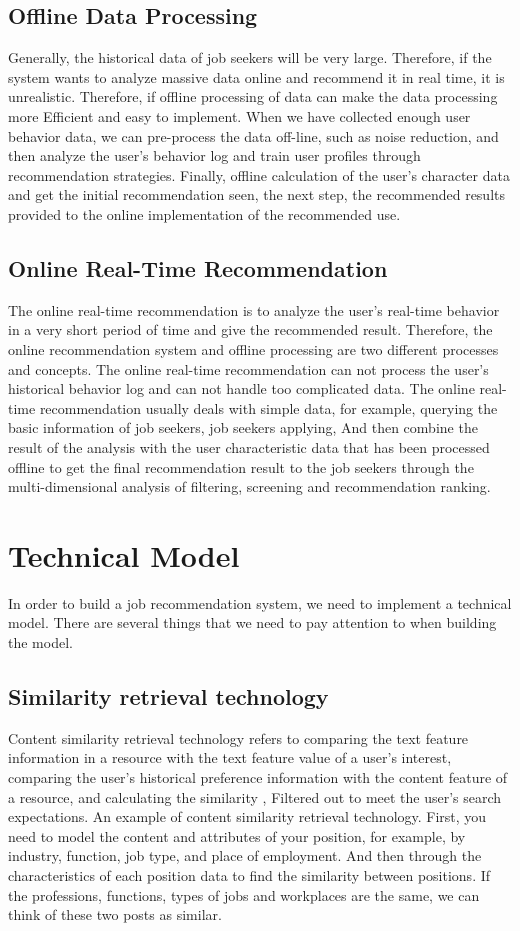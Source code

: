 \documentclass[sigconf]{acmart}
\begin{document}
\subsection{Offline Data Processing}
Generally, the historical data of job seekers will be very large. Therefore, if the system wants to analyze massive data online and recommend it in real time, it is unrealistic. Therefore, if offline processing of data can make the data processing more Efficient and easy to implement. When we have collected enough user behavior data, we can pre-process the data off-line, such as noise reduction, and then analyze the user's behavior log and train user profiles through recommendation strategies. Finally, offline calculation of the user's character data and get the initial recommendation seen, the next step, the recommended results provided to the online implementation of the recommended use.

\subsection{Online Real-Time Recommendation}
The online real-time recommendation is to analyze the user's real-time behavior in a very short period of time and give the recommended result. Therefore, the online recommendation system and offline processing are two different processes and concepts. The online real-time recommendation can not process the user's historical behavior log and can not handle too complicated data. The online real-time recommendation usually deals with simple data, for example, querying the basic information of job seekers, job seekers applying, And then combine the result of the analysis with the user characteristic data that has been processed offline to get the final recommendation result to the job seekers through the multi-dimensional analysis of filtering, screening and recommendation ranking.


\section{Technical Model}
In order to build a job recommendation system, we need to implement a technical model. There are several things that we need to pay attention to when building the model.

\subsection{Similarity retrieval technology}
Content similarity retrieval technology refers to comparing the text feature information in a resource with the text feature value of a user's interest, comparing the user's historical preference information with the content feature of a resource, and calculating the similarity , Filtered out to meet the user's search expectations. An example of content similarity retrieval technology. First, you need to model the content and attributes of your position, for example, by industry, function, job type, and place of employment. And then through the characteristics of each position data to find the similarity between positions. If the professions, functions, types of jobs and workplaces are the same, we can think of these two posts as similar.
\end{document}
